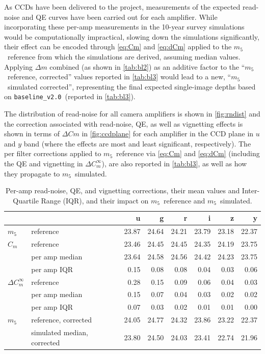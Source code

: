 \documentclass[PST,authoryear,toc]{lsstdoc}
\newcommand{\cm}{\ensuremath{C_m}}
\newcommand{\mf}{\ensuremath{m_5}}
\newcommand{\baseline}{\texttt{baseline\_v2.0}}
\begin{document}
As CCDs have been delivered to the project, measurements of the expected read-noise and QE curves have been carried out for each amplifier. While incorporating these per-amp measurements in the 10-year survey simulations would be computationally impractical, slowing down the simulations significantly, their effect can be encoded through \autoref{eq:Cm} and \autoref{eq:dCm} applied to the \mf\ reference from which the simulations are derived, assuming median values. Applying $\Delta m$ combined (as shown in \autoref{tab:bl2}) as an additive factor to the ``\mf\ reference, corrected'' values reported in \autoref{tab:bl3} would lead to a new,  ``\mf\ simulated corrected'', representing the final expected single-image depths based on \baseline\ (reported in \autoref{tab:bl3}).

The distribution of read-noise for all camera amplifiers is shown in \autoref{fig:rndist} and the correction associated with read-noise, QE, as well as vignetting effects is shown in terms of $\Delta Cm$ in \autoref{fig:ccdplane} for each amplifier in the CCD plane in $u$ and $y$ band (where the effects are most and least significant, respectively).
The per filter corrections applied to \mf\ reference via \autoref{eq:Cm} and \autoref{eq:dCm} (including the QE and vignetting in $\Delta C_m^\infty$), are also reported in \autoref{tab:bl3}, as well as how they propagate to \mf\ simulated.

\FloatBarrier

\begin{table}\caption{Per-amp read-noise, QE, and vignetting corrections, their mean values and Inter-Quartile Range (IQR), and their impact on \mf\ reference and \mf\ simulated.}\label{tab:bl3}
    \centering
 \begin{tabular}{llrrrrrr}
 \hline
 {} & &             u &      g &  r &   i &     z &      y \\
\hline
\mf &  reference &  23.87 &  24.64 &  24.21 &  23.79 &  23.18 &  22.37 \\
\hline
\hline
\cm & reference &  23.46 &  24.45 &  24.45 &  24.35 &  24.19 &  23.75 \\
 &per amp median       &  23.64 &  24.58 &  24.56 &  24.42 &  24.23 &  23.75 \\
& per amp IQR          &   0.15 &   0.08 &   0.08 &   0.04 &   0.03 &   0.06 \\
\hline
 $\Delta C_m^\infty$ & reference       &   0.28 &   0.15 &   0.09 &   0.06 &   0.04 &   0.03 \\
 & per amp median  &   0.15 &   0.07 &   0.04 &   0.03 &   0.02 &   0.02 \\
 & per amp IQR     &   0.07 &   0.03 &   0.02 &   0.01 &   0.01 &   0.00 \\
  \hline
  \hline
\mf & reference, corrected       &  24.05 &  24.77 &  24.32 &  23.86 &  23.22 &  22.37 \\
&simulated median, corrected    &  23.80 &  24.50 &  24.03 &  23.41 &  22.74 &  21.96 \\ 
\end{tabular}
\end{table}
\FloatBarrier
\clearpage
\end{document}
